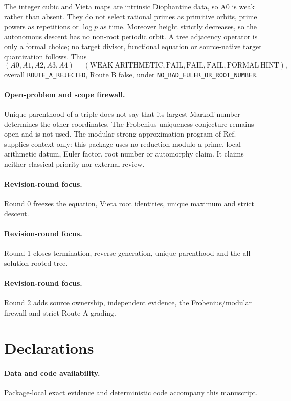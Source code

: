 \documentclass[9pt]{extarticle}
\begin{document}
The integer cubic and Vieta maps are intrinsic Diophantine data, so A0 is
weak rather than absent.  They do not select rational primes as primitive
orbits, prime powers as repetitions or $\log p$ as time.  Moreover height
strictly decreases, so the autonomous descent has no non-root periodic orbit.
A tree adjacency operator is only a formal choice; no target divisor,
functional equation or source-native target quantization follows.  Thus
\[
 (A0,A1,A2,A3,A4)=(\mathrm{WEAK\ ARITHMETIC},\mathrm{FAIL},
 \mathrm{FAIL},\mathrm{FAIL},\mathrm{FORMAL\ HINT}),
\]
overall \texttt{ROUTE\_A\_REJECTED}, Route B false, under
\texttt{NO\_BAD\_EULER\_OR\_ROOT\_NUMBER}.

\paragraph{Open-problem and scope firewall.}
Unique parenthood of a triple does not say that its largest Markoff number
determines the other coordinates.  The Frobenius uniqueness conjecture remains
open and is not used.  The modular strong-approximation program of
Ref.~\cite{BGS16} supplies context only: this package uses no reduction modulo
a prime, local arithmetic datum, Euler factor, root number or automorphy claim.
It claims neither classical priority nor external review.

\ifcase\CRevisionRound
\paragraph{Revision-round focus.} Round 0 freezes the equation, Vieta root
identities, unique maximum and strict descent.
\or
\paragraph{Revision-round focus.} Round 1 closes termination, reverse
generation, unique parenthood and the all-solution rooted tree.
\or
\paragraph{Revision-round focus.} Round 2 adds source ownership, independent
evidence, the Frobenius/modular firewall and strict Route-A grading.
\fi

\section*{Declarations}
\paragraph{Data and code availability.} Package-local exact evidence and
deterministic code accompany this manuscript.
\end{document}
